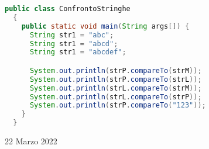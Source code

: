 \documentclass[a4paper]{extarticle}
\begin{document}
\vspace{1em}
\noindent
\begin{lstlisting}[language=Java, caption=Uguaglianza fra stringhe in Java]
  public class ConfrontoStringhe
  {
    public static void main(String args[]) {
      String str1 = "abc";
      String str1 = "abcd";
      String str1 = "abcdef";

      System.out.println(strP.compareTo(strM));
      System.out.println(strP.compareTo(strL));
      System.out.println(strL.compareTo(strM));
      System.out.println(strL.compareTo(strP));
      System.out.println(strP.compareTo("123"));
    }
  }
\end{lstlisting}

\newpage
\noindent
\begin{center}
  22 Marzo 2022
\end{center}
\end{document}
